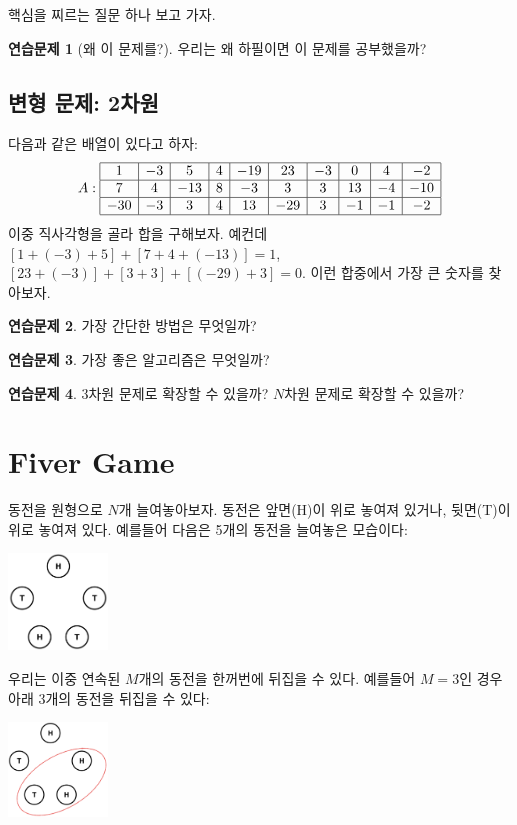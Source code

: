 \documentclass{oblivoir}
\theoremstyle{definition}
\newtheorem{exercise}{연습문제}
\begin{document}
핵심을 찌르는 질문 하나 보고 가자.

\begin{exercise}[왜 이 문제를?]
  우리는 왜 하필이면 이 문제를 공부했을까?
\end{exercise}

\subsection{변형 문제: 2차원}

다음과 같은 배열이 있다고 하자:
\[
A: \begin{array}{|c|c|c|c|c|c|c|c|c|c|}
\hline
1 & -3 & 5 & 4 & -19 & 23 & -3 & 0 & 4 & -2 \\
\hline
7 & 4 & -13 & 8 & -3 & 3 & 3 & 13 & -4 & -10 \\
\hline
-30 & -3 & 3 & 4 & 13 & -29 & 3 & -1 & -1 & -2 \\
\hline
\end{array}
\]
이중 직사각형을 골라 합을 구해보자.  예컨데 $[1+(-3)+5] + [7+4+(-13)]=1$,
$[23+(-3)]+[3+3]+[(-29)+3]=0$.  이런 합중에서 가장 큰 숫자를 찾아보자.

\begin{exercise}
  가장 간단한 방법은 무엇일까?
\end{exercise}

\begin{exercise}
  가장 좋은 알고리즘은 무엇일까?
\end{exercise}

\begin{exercise}
  3차원 문제로 확장할 수 있을까? $N$차원 문제로 확장할 수 있을까?
\end{exercise}

\section{Fiver Game}
동전을 원형으로 $N$개 늘여놓아보자.  동전은 앞면(H)이 위로 놓여져
있거나, 뒷면(T)이 위로 놓여져 있다.  예를들어 다음은 5개의 동전을
늘여놓은 모습이다:
\begin{center}
\includegraphics[width=100px]{p1.png}
\end{center}
우리는 이중 연속된 $M$개의 동전을 한꺼번에 뒤집을 수 있다.  예를들어
$M=3$인 경우 아래 3개의 동전을 뒤집을 수 있다:
\begin{center}
\includegraphics[width=100px]{p2.png}
\end{center}
\end{document}
